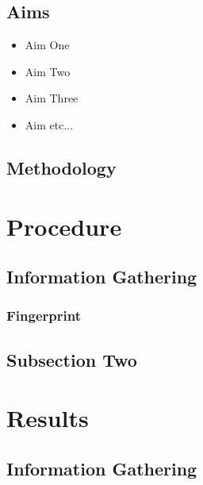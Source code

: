 \documentclass[12pt,a4paper]{article}
\begin{document}
		\subsection{Aims}
			\begin{itemize}
				\item{Aim One}
				\item{Aim Two}
				\item{Aim Three}
				\item{Aim etc...}
			\end{itemize}
			
	\newpage

		\subsection{Methodology}
	
	\clearpage
	
	\section{Procedure}
	
		\subsection{Information Gathering}
		
			\subsubsection{Fingerprint}
			
		\subsection{Subsection Two}
							
	\clearpage
			
	\section{Results}
	
		\subsection{Information Gathering}
					
\end{document}
